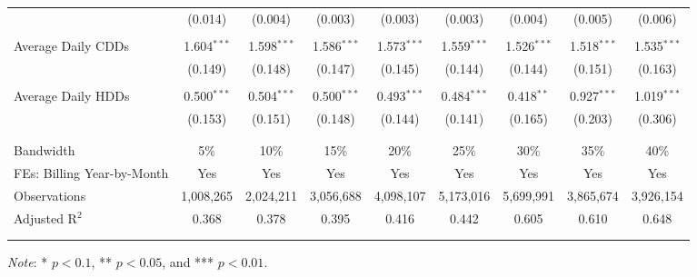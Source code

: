 {\begin{table}[t!]
\begin{adjustbox}{scale = 0.85}
\begin{threeparttable}
\begin{tabular}{@{\extracolsep{3pt}}lcccccccc}
                    & (0.014) & (0.004) & (0.003) & (0.003) & (0.003) & (0.004) & (0.005) & (0.006) \\ 
                    & & & & & & & & \\ 
                    Average Daily CDDs & 1.604$^{***}$ & 1.598$^{***}$ & 1.586$^{***}$ & 1.573$^{***}$ & 1.559$^{***}$ & 1.526$^{***}$ & 1.518$^{***}$ & 1.535$^{***}$ \\ 
                    & (0.149) & (0.148) & (0.147) & (0.145) & (0.144) & (0.144) & (0.151) & (0.163) \\ 
                    & & & & & & & & \\ 
                    Average Daily HDDs & 0.500$^{***}$ & 0.504$^{***}$ & 0.500$^{***}$ & 0.493$^{***}$ & 0.484$^{***}$ & 0.418$^{**}$ & 0.927$^{***}$ & 1.019$^{***}$ \\ 
                    & (0.153) & (0.151) & (0.148) & (0.144) & (0.141) & (0.165) & (0.203) & (0.306) \\ 
                    & & & & & & & & \\
                    \hline
                    \\[-2.0ex]
                    Bandwidth & 5\% & 10\% & 15\% & 20\% & 25\% & 30\% & 35\% & 40\% \\ 
                    FEs: Billing Year-by-Month & Yes & Yes & Yes & Yes & Yes & Yes & Yes & Yes \\ 
                    Observations & 1,008,265 & 2,024,211 & 3,056,688 & 4,098,107 & 5,173,016 & 5,699,991 & 3,865,674 & 3,926,154 \\ 
                    Adjusted R$^{2}$ & 0.368 & 0.378 & 0.395 & 0.416 & 0.442 & 0.605 & 0.610 & 0.648 \\ 
                    \\[-2.0ex]
                    \hline \hline
                    \\[-4.5ex]
                \end{tabular}
                \begin{tablenotes}[flushleft]
                    \footnotesize
                    \item \textit{Note}: * $p < 0.1$, ** $p < 0.05$, and *** $p < 0.01$.
                \end{tablenotes}
            \end{threeparttable}
        \end{adjustbox}
    \end{table}
}
